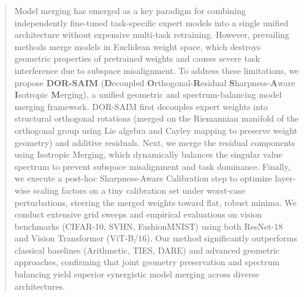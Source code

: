 \documentclass{article}
\begin{document}

\printAffiliationsAndNotice{}

\begin{abstract}
Model merging has emerged as a key paradigm for combining independently fine-tuned task-specific expert models into a single unified architecture without expensive multi-task retraining. However, prevailing methods merge models in Euclidean weight space, which destroys geometric properties of pretrained weights and causes severe task interference due to subspace misalignment. To address these limitations, we propose \textbf{DOR-SAIM} (\textbf{D}ecoupled \textbf{O}rthogonal-\textbf{R}esidual \textbf{S}harpness-\textbf{A}ware \textbf{I}sotropic \textbf{M}erging), a unified geometric and spectrum-balancing model merging framework. DOR-SAIM first decouples expert weights into structural orthogonal rotations (merged on the Riemannian manifold of the orthogonal group using Lie algebra and Cayley mapping to preserve weight geometry) and additive residuals. Next, we merge the residual components using Isotropic Merging, which dynamically balances the singular value spectrum to prevent subspace misalignment and task dominance. Finally, we execute a post-hoc Sharpness-Aware Calibration step to optimize layer-wise scaling factors on a tiny calibration set under worst-case perturbations, steering the merged weights toward flat, robust minima. We conduct extensive grid sweeps and empirical evaluations on vision benchmarks (CIFAR-10, SVHN, FashionMNIST) using both ResNet-18 and Vision Transformer (ViT-B/16). Our method significantly outperforms classical baselines (Arithmetic, TIES, DARE) and advanced geometric approaches, confirming that joint geometry preservation and spectrum balancing yield superior synergistic model merging across diverse architectures.
\end{abstract}
\end{document}
